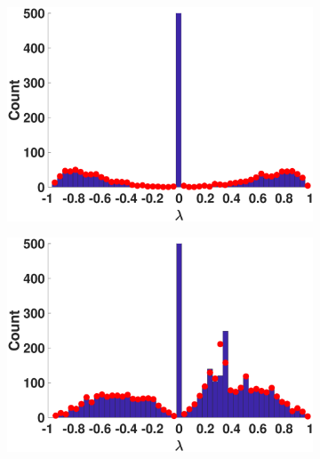 \begin{figure}[ht]
  \begin{subfigure}[t]{0.19\textwidth}
    \centering  
    \captionsetup{justification=centering,font=scriptsize}
    \includegraphics[width=\textwidth,trim = .4cm 0.5cm 3.5cm 1.3cm,clip]
    {./ndos/pics/erdos}
    \label{fig:erdos_dos}
  \end{subfigure}
  \begin{subfigure}[t]{0.19\textwidth}
    \centering  
    \captionsetup{justification=centering,font=scriptsize}
    \includegraphics[width=\textwidth,trim = .4cm 0.5cm 3.5cm 1.3cm,clip]
    {./ndos/pics/as19991115}
    \label{fig:as_dos}
  \end{subfigure}
  \begin{subfigure}[t]{0.19\textwidth}
    \centering
    \captionsetup{justification=centering,font=scriptsize}

\end{subfigure}
\end{figure}
